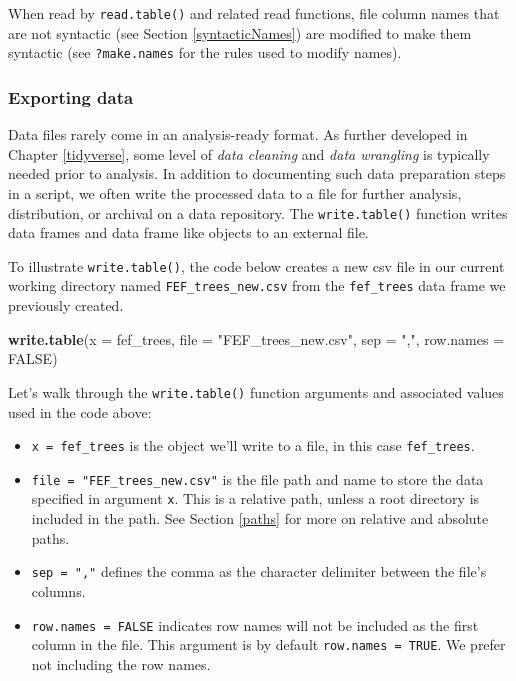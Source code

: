 \documentclass[
  11pt,
]{krantz}
\newenvironment{Shaded}{\begin{snugshade}}{\end{snugshade}}
\newcommand{\DataTypeTok}[1]{\textcolor[rgb]{0.13,0.29,0.53}{#1}}
\newcommand{\KeywordTok}[1]{\textcolor[rgb]{0.13,0.29,0.53}{\textbf{#1}}}
\newcommand{\NormalTok}[1]{#1}
\newcommand{\OtherTok}[1]{\textcolor[rgb]{0.56,0.35,0.01}{#1}}
\newcommand{\StringTok}[1]{\textcolor[rgb]{0.31,0.60,0.02}{#1}}
\providecommand{\tightlist}{%
  \setlength{\itemsep}{0pt}\setlength{\parskip}{0pt}}
\theoremstyle{definition}
\theoremstyle{definition}
\theoremstyle{definition}
\theoremstyle{definition}
\theoremstyle{remark}
\begin{document}
When read by \texttt{read.table()} and related read functions, file column names that are not syntactic (see Section \ref{syntacticNames}) are modified to make them syntactic (see \texttt{?make.names} for the rules used to modify names).

\hypertarget{exporting-data}{%
\subsubsection*{Exporting data}\label{exporting-data}}


Data files rarely come in an analysis-ready format. As further developed in Chapter \ref{tidyverse}, some level of \emph{data cleaning} and \emph{data wrangling} is typically needed prior to analysis. In addition to documenting such data preparation steps in a script, we often write the processed data to a file for further analysis, distribution, or archival on a data repository. The \texttt{write.table()} function writes data frames and data frame like objects to an external file.

To illustrate \texttt{write.table()}, the code below creates a new csv file in our current working directory named \texttt{FEF\_trees\_new.csv} from the \texttt{fef\_trees} data frame we previously created.

\begin{Shaded}
\begin{Highlighting}[]
\KeywordTok{write.table}\NormalTok{(}\DataTypeTok{x =}\NormalTok{ fef\_trees, }\DataTypeTok{file =} \StringTok{"FEF\_trees\_new.csv"}\NormalTok{, }\DataTypeTok{sep =} \StringTok{","}\NormalTok{, }
        \DataTypeTok{row.names =} \OtherTok{FALSE}\NormalTok{)}
\end{Highlighting}
\end{Shaded}

Let's walk through the \texttt{write.table()} function arguments and associated values used in the code above:

\begin{itemize}
\tightlist
\item
  \texttt{x\ =\ fef\_trees} is the object we'll write to a file, in this case \texttt{fef\_trees}.
\item
  \texttt{file\ =\ "FEF\_trees\_new.csv"} is the file path and name to store the data specified in argument \texttt{x}. This is a relative path, unless a root directory is included in the path. See Section \ref{paths} for more on relative and absolute paths.
\item
  \texttt{sep\ =\ ","} defines the comma as the character delimiter between the file's columns.
\item
  \texttt{row.names\ =\ FALSE} indicates row names will not be included as the first column in the file. This argument is by default \texttt{row.names\ =\ TRUE}. We prefer not including the row names.
\end{itemize}
\end{document}
